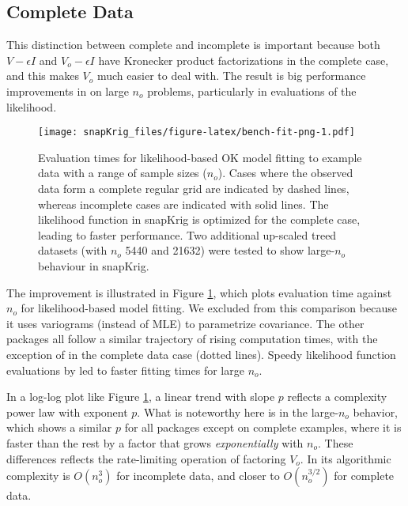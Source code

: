 \hypertarget{complete-data}{%
\subsection{Complete Data}\label{complete-data}}

This distinction between complete and incomplete is important because both \(V - \epsilon I\) and \(V_o - \epsilon I\) have Kronecker product factorizations in the complete case, and this makes \(V_o\) much easier to deal with. The result is big performance improvements in  on large \(n_o\) problems, particularly in evaluations of the likelihood.

\begin{figure}
\centering
\texttt{[image: snapKrig\_files/figure-latex/bench-fit-png-1.pdf]}
\caption{\label{fig:bench-fit-png}Evaluation times for likelihood-based OK model fitting to example data with a range of sample sizes (\(n_o\)). Cases where the observed data form a complete regular grid are indicated by dashed lines, whereas incomplete cases are indicated with solid lines. The likelihood function in snapKrig is optimized for the complete case, leading to faster performance. Two additional up-scaled treed datasets (with \(n_o\) 5440 and 21632) were tested to show large-\(n_o\) behaviour in snapKrig.}
\end{figure}

The improvement is illustrated in Figure \ref{fig:bench-fit-png}, which plots evaluation time against \(n_o\) for likelihood-based model fitting. We excluded  from this comparison because it uses variograms (instead of MLE) to parametrize covariance. The other packages all follow a similar trajectory of rising computation times, with the exception of  in the complete data case (dotted lines). Speedy likelihood function evaluations by  led to faster fitting times for large \(n_o\).

In a log-log plot like Figure \ref{fig:bench-fit-png}, a linear trend with slope \(p\) reflects a complexity power law with exponent \(p\). What is noteworthy here is in the large-\(n_o\) behavior, which shows a similar \(p\) for all packages except  on complete examples, where it is faster than the rest by a factor that grows \emph{exponentially} with \(n_o\). These differences reflects the rate-limiting operation of factoring \(V_o\). In  its algorithmic complexity is \(O( n_o^3 )\) for incomplete data, and closer to \(O(n_o^{3/2})\) for complete data.

